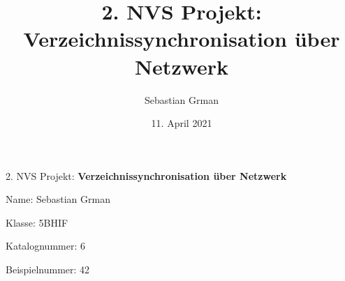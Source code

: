 \documentclass{article}
\begin{document}
\clearpage
\thispagestyle{empty}
\author{Sebastian Grman}
\date{11. April 2021}
\title{2. NVS Projekt: Verzeichnissynchronisation über Netzwerk}
\begin{titlepage}
   \begin{center}
        \vspace*{1cm}

        \huge
        2. NVS Projekt:
        \textbf{Verzeichnissynchronisation über Netzwerk}
    \end{center}

    \vspace{1.5cm}
    \begin{addmargin}[8em]{0em}
        \Large
        Name: Sebastian Grman\par
        Klasse: 5BHIF\par
        Katalognummer: 6\par
        Beispielnummer: 42
    \end{addmargin}
    
    \vfill
\end{titlepage}
\clearpage
{}
\tableofcontents
\newpage






\newpage

\printbibliography
\end{document}
